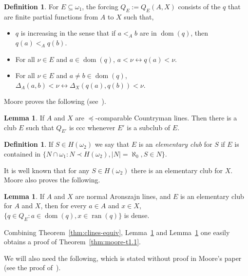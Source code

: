 \documentclass[10pt]{amsart}
\theoremstyle{definition}
\newtheorem{definition}[theorem]{Definition}
\newtheorem{lemma}[theorem]{Lemma}
\theoremstyle{remark}
\newcommand{\seb}{\subseteq}
\newcommand{\lra}{\leftrightarrow}
\newcommand{\eleq}{\preceq}
\newcommand{\1}{\mathbbm{1}}
\DeclareMathOperator{\dom}{dom}
\DeclareMathOperator{\ran}{ran}
\begin{document}
\begin{definition}\label{df:moore-forcing}
  For $E \seb \omega_{1}$, the forcing $Q_{E} := Q_{E}(A,X)$ consists of the
  $q$ that are finite partial functions from $A$ to $X$ such that,
  \begin{itemize}\itemsep0em
    \item $q$ is increasing in the sense that if $a <_{A} b$ are in $\dom(q)$,
    then $q(a) <_{A} q(b)$.
    \item For all $\nu \in E$ and $a \in \dom(q)$, $a < \nu \lra q(a) < \nu$.
    \item For all $\nu \in E$ and $a \neq b \in \dom(q)$,
    $\Delta_{A}(a,b) < \nu \lra \Delta_{X}(q(a),q(b)) < \nu$.
  \end{itemize}
\end{definition}

Moore proves the following (see~\cite[Section~3]{Moore2009}).

\begin{lemma}\label{lem:moore-ccc} If $A$ and $X$ are $\eleq$-comparable
Countryman lines. Then there is a club $E$ such that $Q_{E'}$ is ccc
whenever $E'$ is a subclub of $E$.
\end{lemma}

\begin{definition}
  If $S \in H(\omega_{2})$ we say that $E$ is an \emph{elementary club}
  for $S$ if $E$ is contained in
  $\{N \cap \omega_{1} : N \prec H(\omega_{2}), |N| = \aleph_{0}, S \in N\}$.
\end{definition}

It is well known that for any $S \in H(\omega_{2})$ there is
an elementary club for $X$. Moore also proves the following.

\begin{lemma}\label{lem:moore-density}
  If $A$ and $X$ are normal Aronszajn lines, and $E$ is an
  elementary club for $A$ and $X$, then for every $a \in A$ and $x \in
  X$, $\{q \in Q_{E} : a \in \dom(q), x\in \ran(q)\}$ is dense.
\end{lemma}

Combining Theorem~\ref{thm:clines-equiv}, Lemma~\ref{lem:moore-ccc}
and Lemma~\ref{lem:moore-density} one easily obtains a proof of
Theorem~\ref{thm:moore-t1.1}.

We will also need the following, which is stated without proof
in Moore's paper (see the proof of~\cite[Lemma~3.4]{Moore2009}).
\end{document}
